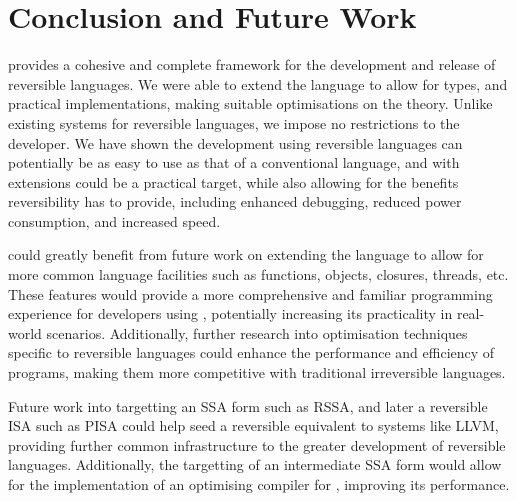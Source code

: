 \chapter{Conclusion and Future Work}



\rimp provides a cohesive and complete framework for the development and release of reversible languages. We were able to extend the language to allow for types, and practical implementations, making suitable optimisations on the theory. 
Unlike existing systems for reversible languages, we impose no restrictions to the developer.
We have shown the development using reversible languages can potentially be as easy to use as that of a conventional language, and with extensions could be a practical target, while also allowing for the benefits reversibility has to provide, including enhanced debugging, reduced power consumption, and increased speed\cite{PrologDebugger, landauerIrreversibility}.

\rimp could greatly benefit from future work on extending the language to allow for more common language facilities such as functions, objects, closures, threads, etc. These features would provide a more comprehensive and familiar programming experience for developers using \rimp, potentially increasing its practicality in real-world scenarios. Additionally, further research into optimisation techniques\cite{Optimisation} specific to reversible languages could enhance the performance and efficiency of \rimplang programs, making them more competitive with traditional irreversible languages.

Future work into targetting an SSA form such as RSSA\cite{RSSA}, and later a reversible ISA such as PISA\cite{pisa} could help seed a reversible equivalent to systems like LLVM, providing further common infrastructure to the greater development of reversible languages. Additionally, the targetting of an intermediate SSA form would allow for the implementation of an optimising compiler for \rimp, improving its performance\cite{Optimisation}.

